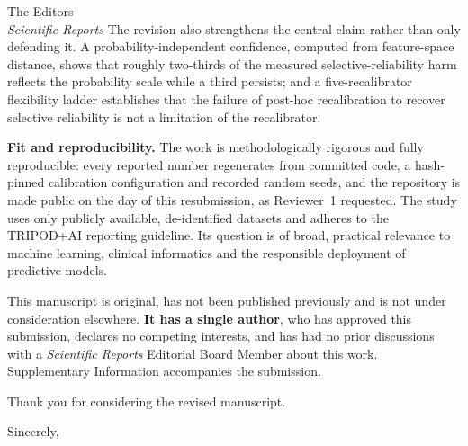 \documentclass[11pt]{letter}
\begin{document}
\begin{letter}{The Editors\\\textit{Scientific Reports}}
The revision also strengthens the central claim rather than only defending it. A
probability-independent confidence, computed from feature-space distance, shows that roughly
two-thirds of the measured selective-reliability harm reflects the probability scale while a third
persists; and a five-recalibrator flexibility ladder establishes that the failure of post-hoc
recalibration to recover selective reliability is not a limitation of the recalibrator.

\textbf{Fit and reproducibility.} The work is methodologically rigorous and fully reproducible: every
reported number regenerates from committed code, a hash-pinned calibration configuration and
recorded random seeds, and the repository is made public on the day of this resubmission, as
Reviewer~1 requested. The study uses only publicly available, de-identified datasets and adheres to
the TRIPOD+AI reporting guideline. Its question is of broad, practical relevance to machine
learning, clinical informatics and the responsible deployment of predictive models.

This manuscript is original, has not been published previously and is not under consideration
elsewhere. \textbf{It has a single author}, who has approved this submission, declares no competing
interests, and has had no prior discussions with a \textit{Scientific Reports} Editorial Board
Member about this work. Supplementary Information accompanies the submission.

Thank you for considering the revised manuscript.

\closing{Sincerely,}
\end{letter}
\end{document}
